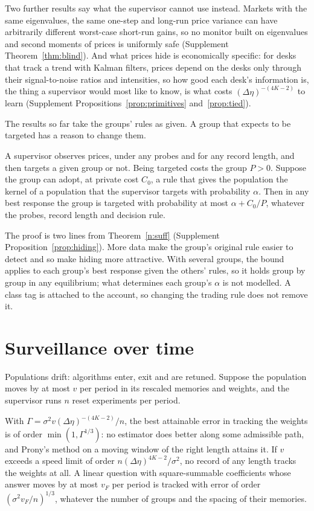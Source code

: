 Two further results say what the supervisor cannot use instead. Markets with the same eigenvalues, the same one-step and long-run price variance can have arbitrarily different worst-case short-run gains, so no monitor built on eigenvalues and second moments of prices is uniformly safe (Supplement Theorem~\ref{thm:blind}). And what prices hide is economically specific: for desks that track a trend with Kalman filters, prices depend on the desks only through their signal-to-noise ratios and intensities, so how good each desk's information is, the thing a supervisor would most like to know, is what costs $(\Delta\eta)^{-(4K-2)}$ to learn (Supplement Propositions~\ref{prop:primitives} and~\ref{prop:tied}).

The results so far take the groups' rules as given. A group that expects to be targeted has a reason to change them.

\begin{proposition}\label{n:hiding}
A supervisor observes prices, under any probes and for any record length, and then targets a given group or not. Being targeted costs the group $P>0$. Suppose the group can adopt, at private cost $C_0$, a rule that gives the population the kernel of a population that the supervisor targets with probability $\alpha$. Then in any best response the group is targeted with probability at most $\alpha+C_0/P$, whatever the probes, record length and decision rule.
\end{proposition}

The proof is two lines from Theorem~\ref{n:suff} (Supplement Proposition~\ref{prop:hiding}). More data make the group's original rule easier to detect and so make hiding more attractive. With several groups, the bound applies to each group's best response given the others' rules, so it holds group by group in any equilibrium; what determines each group's $\alpha$ is not modelled. A class tag is attached to the account, so changing the trading rule does not remove it.

\section{Surveillance over time}\label{n:dyn}

Populations drift: algorithms enter, exit and are retuned. Suppose the population moves by at most $v$ per period in its rescaled memories and weights, and the supervisor runs $n$ reset experiments per period.

\begin{theorem}\label{n:track}
With $\Gamma=\sigma^2v(\Delta\eta)^{-(4K-2)}/n$, the best attainable error in tracking the weights is of order $\min(1,\Gamma^{1/3})$: no estimator does better along some admissible path, and Prony's method on a moving window of the right length attains it. If $v$ exceeds a speed limit of order $n(\Delta\eta)^{4K-2}/\sigma^2$, no record of any length tracks the weights at all. A linear question with square-summable coefficients whose answer moves by at most $v_F$ per period is tracked with error of order $(\sigma^2v_F/n)^{1/3}$, whatever the number of groups and the spacing of their memories.
\end{theorem}

